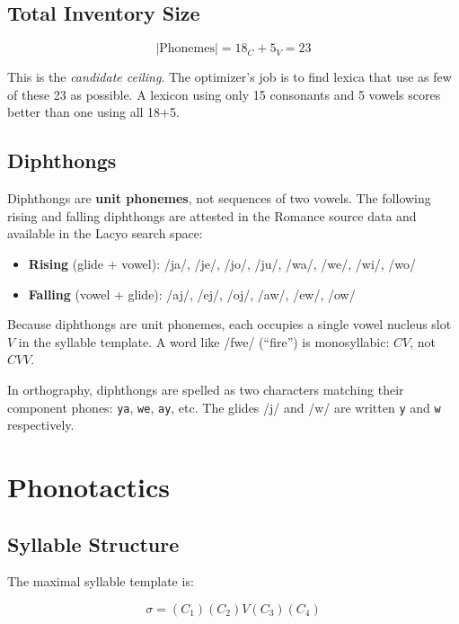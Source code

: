 \documentclass[12pt]{book}
\begin{document}
\subsection{Total Inventory Size}

\begin{equation}
|\text{Phonemes}| = 18_C + 5_V = 23
\end{equation}

This is the \emph{candidate ceiling}. The optimizer's job is to find lexica
that use as few of these 23 as possible. A lexicon using only 15 consonants
and 5 vowels scores better than one using all 18+5.

\subsection{Diphthongs}

Diphthongs are \textbf{unit phonemes}, not sequences of two vowels.
The following rising and falling diphthongs are attested in the Romance
source data and available in the Lacyo search space:

\begin{itemize}
  \item \textbf{Rising} (glide + vowel): /ja/, /je/, /jo/, /ju/,
        /wa/, /we/, /wi/, /wo/
  \item \textbf{Falling} (vowel + glide): /aj/, /ej/, /oj/,
        /aw/, /ew/, /ow/
\end{itemize}

\noindent Because diphthongs are unit phonemes, each occupies a single vowel
nucleus slot $V$ in the syllable template. A word like /fwe/ (``fire'') is
monosyllabic: $C V$, not $C V V$.

In orthography, diphthongs are spelled as two characters matching their
component phones: \texttt{ya}, \texttt{we}, \texttt{ay}, etc.
The glides /j/ and /w/ are written \texttt{y} and \texttt{w} respectively.


\section{Phonotactics}
\label{sec:phonotactics}

\subsection{Syllable Structure}

The maximal syllable template is:

\begin{equation}
\sigma = (C_1)(C_2) V (C_3)(C_4)
\end{equation}
\end{document}
